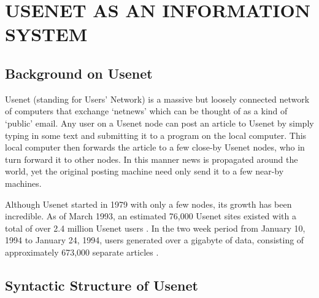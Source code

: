 
\section{USENET AS AN INFORMATION SYSTEM}
\label{sec:usenet}


\subsection{Background on Usenet}

Usenet (standing for Users' Network) is a massive but loosely connected
network of computers that exchange `netnews' which can be thought of as a
kind of `public' email. Any user on a Usenet node can post an article to
Usenet by simply typing in some text and submitting it to a program on the
local computer. This local computer then forwards the article to a few
close-by Usenet nodes, who in turn forward it to other nodes. In this
manner news is propagated around the world, yet the original posting
machine need only send it to a few near-by machines.

Although Usenet started in 1979 with only a few nodes, its growth has been
incredible.  As of March 1993, an estimated 76,000 Usenet sites existed with a
total of over 2.4 million Usenet users \cite{reid-usenet-93}. In the two week
period from January 10, 1994 to January 24, 1994, users generated over a
gigabyte of data, consisting of approximately 673,000 separate articles
\cite{uunet-usenet-94}.

\subsection{Syntactic Structure of Usenet}

